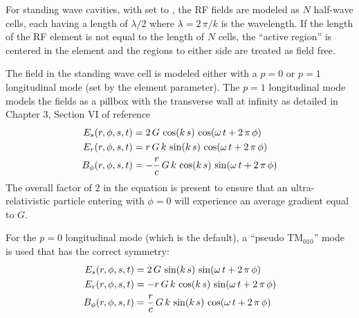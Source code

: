 For standing wave cavities, with  set to , the RF fields are
modeled as $N$ half-wave cells, each having a length of $\lambda/2$ where $\lambda = 2 \, \pi / k$
is the wavelength. If the length of the RF element is not equal to the length of $N$ cells, the
``active region'' is centered in the element and the regions to either side are treated as field
free.

The field in the standing wave cell is modeled either with a $p = 0$ or $p = 1$ longitudinal mode
(set by the  element parameter). The $p = 1$ longitudinal mode models the
fields as a pillbox with the transverse wall at infinity as detailed in Chapter 3, Section VI of
reference \cite{b:lee}
\begin{align}
  E_s(r, \phi, s, t)    &= 2 \, G \,                 \cos(k \, s) \, \cos(\omega \, t + 2 \, \pi \, \phi) \nonumber \\
  E_r(r, \phi, s, t)    &= r \, G \, k \,            \sin(k \, s) \, \cos(\omega \, t + 2 \, \pi \, \phi) \\
  B_\phi(r, \phi, s, t) &= -\frac{r}{c} \, G \, k \, \cos(k \, s) \, \sin(\omega \, t + 2 \, \pi \, \phi) \nonumber
  \label{egot2}
\end{align}
The overall factor of 2 in the equation is present to ensure that an ultra-relativistic particle
entering with $\phi = 0$ will experience an average gradient equal to $G$.

For the $p = 0$ longitudinal mode (which is the default), a ``pseudo TM$_{010}$'' mode is used that
has the correct symmetry:
\begin{align}
  E_s(r, \phi, s, t)    &= 2 \, G \,                \sin(k \, s) \, \sin(\omega \, t + 2 \, \pi \, \phi) \nonumber \\
  E_r(r, \phi, s, t)    &= -r \, G \, k \,          \cos(k \, s) \, \sin(\omega \, t + 2 \, \pi \, \phi) \\
  B_\phi(r, \phi, s, t) &= \frac{r}{c} \, G \, k \, \sin(k \, s) \, \cos(\omega \, t + 2 \, \pi \, \phi) \nonumber
  \label{egot3}
\end{align}
